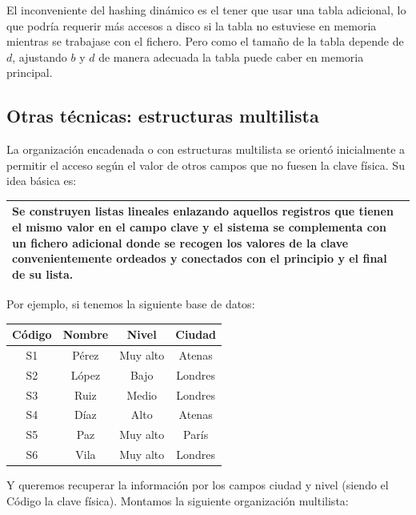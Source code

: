 \documentclass[10pt,a4paper,spanish]{report}
\begin{document}


El inconveniente del hashing dinámico es el tener que usar una tabla adicional, lo que podría requerir más accesos a disco si la tabla no estuviese en memoria mientras se trabajase con el fichero. Pero como el tamaño de la tabla depende de $d$, ajustando $b$ y $d$ de manera adecuada la tabla puede caber en memoria principal.

\textcolor[rgb]{1,0.2,0.3}{\subsection{Otras técnicas: estructuras multilista}}
La organización encadenada o con estructuras multilista se orientó inicialmente a permitir el acceso según el valor de otros campos que no fuesen la clave física. Su idea básica es:

\begin{center}
\begin{tabular}{p{12.5cm}}
\hline
Se construyen listas lineales enlazando aquellos registros que tienen el mismo valor en el campo clave y el sistema se complementa con un fichero adicional donde se recogen los valores de la clave convenientemente ordeados y conectados con el principio y el final de su lista. \\
\hline
\end{tabular}
\end{center}

Por ejemplo, si tenemos la siguiente base de datos:

\begin{center}
\begin{tabular}{c c c c}
\hline
Código & Nombre & Nivel & Ciudad \\
\hline
S1 & Pérez & Muy alto & Atenas \\
S2 & López & Bajo & Londres \\
S3 & Ruiz & Medio & Londres \\
S4 & Díaz & Alto & Atenas \\
S5 & Paz & Muy alto & París \\
S6 & Vila & Muy alto & Londres \\
\hline
\end{tabular}
\end{center}

Y queremos recuperar la información por los campos ciudad y nivel (siendo el Código la clave física). Montamos la siguiente organización multilista:


\end{document}
